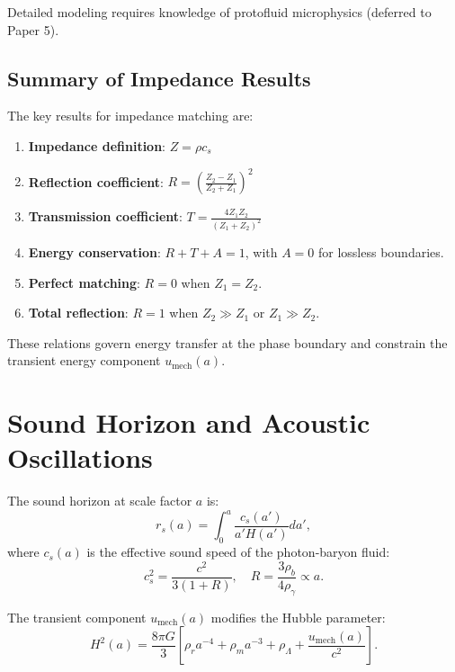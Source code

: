 \documentclass[11pt,a4paper]{article}
\newcommand{\umech}{\ensuremath{u_{\mathrm{mech}}}}
\theoremstyle{definition}
\theoremstyle{remark}
\begin{document}
Detailed modeling requires knowledge of protofluid microphysics (deferred to Paper 5).

\subsection{Summary of Impedance Results}
\label{sec:impedance_summary}

The key results for impedance matching are:

\begin{enumerate}[leftmargin=*, itemsep=0.2em]
\item \textbf{Impedance definition}: $Z = \rho c_s$
\item \textbf{Reflection coefficient}: $R = \left(\frac{Z_2 - Z_1}{Z_2 + Z_1}\right)^2$
\item \textbf{Transmission coefficient}: $T = \frac{4Z_1 Z_2}{(Z_1 + Z_2)^2}$
\item \textbf{Energy conservation}: $R + T + A = 1$, with $A = 0$ for lossless boundaries.
\item \textbf{Perfect matching}: $R = 0$ when $Z_1 = Z_2$.
\item \textbf{Total reflection}: $R = 1$ when $Z_2 \gg Z_1$ or $Z_1 \gg Z_2$.
\end{enumerate}

These relations govern energy transfer at the phase boundary and constrain the transient energy component $\umech(a)$.

\section{Sound Horizon and Acoustic Oscillations}
\label{app:sound_horizon}

The sound horizon at scale factor $a$ is:
\begin{equation}
r_s(a) = \int_0^a \frac{c_s(a')}{a' H(a')} da',
\end{equation}
where $c_s(a)$ is the effective sound speed of the photon-baryon fluid:
\begin{equation}
c_s^2 = \frac{c^2}{3(1 + R)}, \quad R = \frac{3\rho_b}{4\rho_\gamma} \propto a.
\end{equation}

The transient component $\umech(a)$ modifies the Hubble parameter:
\begin{equation}
H^2(a) = \frac{8\pi G}{3}\left[\rho_r a^{-4} + \rho_m a^{-3} + \rho_\Lambda + \frac{\umech(a)}{c^2}\right].
\end{equation}
\end{document}
